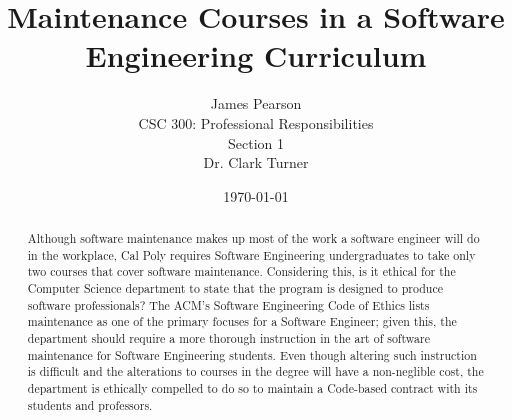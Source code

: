 \documentclass[11pt]{article}
\begin{document}
\title{\vfill Maintenance Courses in a Software Engineering Curriculum} %
\author{
James Pearson \vspace{10pt} \\
CSC 300: Professional Responsibilities  \vspace{10pt} \\
Section 1 \vspace{10pt} \\
Dr. Clark Turner \vspace{10pt} \\
}
\date{\today}

\maketitle

\vfill  %
\begin{abstract}
Although software maintenance makes up most of the work a software engineer will do in the workplace, Cal Poly requires Software Engineering undergraduates to take only two courses that cover software maintenance.  Considering this, is it ethical for the Computer Science department to state that the program is designed to produce software professionals?  The ACM's Software Engineering Code of Ethics lists maintenance as one of the primary focuses for a Software Engineer; given this, the department should require a more thorough instruction in the art of software maintenance for Software Engineering students.  Even though altering such instruction is difficult and the alterations to courses in the degree will have a non-neglible cost, the department is ethically compelled to do so to maintain a Code-based contract with its students and professors.
\end{abstract}

\thispagestyle{empty} %
\newpage


\thispagestyle{empty}  %
\tableofcontents

\newpage

\end{document}
